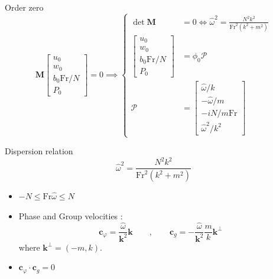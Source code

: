 \documentclass[10pt]{beamer}
\begin{document}
\begin{frame}[fragile]{Order zero}
  	\begin{equation*}\!\!\!\!\!
  		\mathbf{M}
  		\begin{bmatrix}
  			u_{0}\\
  			w_{0}\\
  			b_{0}\mathrm{Fr}/N\\
  			P_{0}
  		\end{bmatrix}
  		=0 \implies 
  		\begin{cases}
  			\det{\mathbf{M}}&=0\iff \hat{\omega}^{2}=\frac{N^{2}k^{2}}{\mathrm{Fr}^{2}\left(k^{2}+m^{2}\right)}\\
  			\begin{bmatrix}
  				u_{0}\\
  				w_{0}\\
  				b_{0}\mathrm{Fr}/N\\
  				P_{0}
  			\end{bmatrix}&
  			=\phi_{0}\boldsymbol{\mathcal{P}}\\
  			\boldsymbol{\mathcal{P}}&=
  			\begin{bmatrix}
  				\hat{\omega}/k\\
  				-\hat{\omega}/m\\
  				-iN/m\mathrm{Fr}\\
  				\hat{\omega}^{2}/k^{2}
  			\end{bmatrix}
  		\end{cases}
  	\end{equation*}
\end{frame}

\begin{frame}[fragile]{Dispersion relation}
  	\begin{equation*}
  		\hat{\omega}^{2}=\frac{N^{2}k^{2}}{\mathrm{Fr}^{2}\left(k^{2}+m^{2}\right)}
  	\end{equation*}
  	\begin{itemize}
  		\item $-N\leq\mathrm{Fr}\hat{\omega}\leq N$
  		\item Phase and Group velocities : 
  		\begin{equation*}
    		\mathbf{c}_{\varphi}=\frac{\hat{\omega}}{\mathbf{k}^{2}}\mathbf{k}
    		\qquad,\qquad 
    		\mathbf{c}_{g}=-\frac{\hat{\omega}}{\mathbf{k}^{2}}\frac{m}{k}\mathbf{k}^{\bot}
  		\end{equation*}
  		where $\mathbf{k}^{\bot}=\left(-m,k\right)$.
  		\item $\mathbf{c}_{\varphi}\cdot\mathbf{c}_{g}=0$
  	\end{itemize}
\end{frame}
\end{document}
